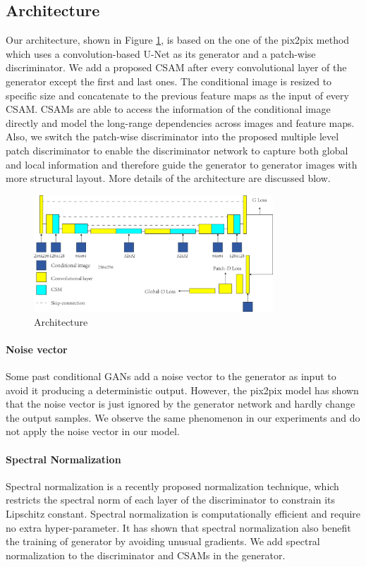 \subsection{Architecture}
\label{subsec:architecture}
Our architecture, shown in Figure \ref{fig:architecture}, is based on the one of the pix2pix method which uses a convolution-based U-Net \cite{Unet} as its generator and a patch-wise discriminator. We add a proposed CSAM after every convolutional layer of the generator except the first and last ones. The conditional image is resized to specific size and concatenate to the previous feature maps as the input of every CSAM. CSAMs are able to access the information of the conditional image directly and model the long-range dependencies across images and feature maps. Also, we switch the patch-wise discriminator into the proposed multiple level patch discriminator to enable the discriminator network to capture both global and local information and therefore guide the generator to generator images with more structural layout. More details of the architecture are discussed blow.
%
\begin{figure}
	\includegraphics[width=0.8\textwidth]{figures/architecture}
	\caption{Architecture}
	\label{fig:architecture}
\end{figure}
%
%
\paragraph{Noise vector} Some past conditional GANs add a noise vector to the generator as input to avoid it producing a deterministic output. However, the pix2pix model has shown that the noise vector is just ignored by the generator network and hardly change the output samples. We observe the same phenomenon in our experiments and do not apply the noise vector in our model. 
\paragraph{Spectral Normalization} Spectral normalization \cite{SN} is a recently proposed normalization technique, which restricts the spectral norm of each layer of the discriminator to constrain its Lipschitz constant. Spectral normalization is computationally efficient and require no extra hyper-parameter. It has shown that spectral normalization also benefit the training of generator by avoiding unusual gradients. We add spectral normalization to the discriminator and CSAMs in the generator.
%